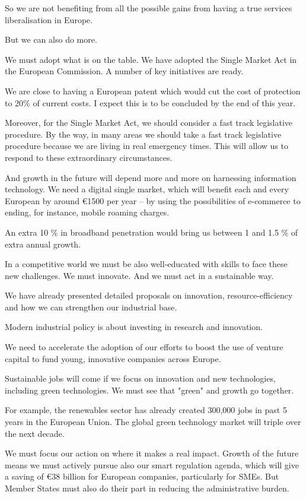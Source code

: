 \documentclass[a4paper,11pt]{article}
\begin{document}
So we are not benefiting from all the possible gains from having a true services liberalisation in Europe.

But we can also do more.

We must adopt what is on the table. We have adopted the Single Market Act in the European Commission. A number of key initiatives are ready.

We are close to having a European patent which would cut the cost of protection to 20\% of current costs. I expect this is to be concluded by the end of this year.

Moreover, for the Single Market Act, we should consider a fast track legislative procedure. By the way, in many areas we should take a fast track legislative procedure because we are living in real emergency times. This will allow us to respond to these extraordinary circumstances.

And growth in the future will depend more and more on harnessing information technology. We need a digital single market, which will benefit each and every European by around \euro1500 per year – by using the possibilities of e-commerce to ending, for instance, mobile roaming charges.

An extra 10 \% in broadband penetration would bring us between 1 and 1.5 \% of extra annual growth.

In a competitive world we must be also well-educated with skills to face these new challenges. We must innovate. And we must act in a sustainable way.

We have already presented detailed proposals on innovation, resource-efficiency and how we can strengthen our industrial base.

Modern industrial policy is about investing in research and innovation.

We need to accelerate the adoption of our efforts to boost the use of venture capital to fund young, innovative companies across Europe.

Sustainable jobs will come if we focus on innovation and new technologies, including green technologies. We must see that "green" and growth go together.

For example, the renewables sector has already created 300,000 jobs in past 5 years in the European Union. The global green technology market will triple over the next decade.

We must focus our action on where it makes a real impact. Growth of the future means we must actively pursue also our smart regulation agenda, which will give a saving of \euro 38 billion for European companies, particularly for SMEs. But Member States must also do their part in reducing the administrative burden.
\end{document}
